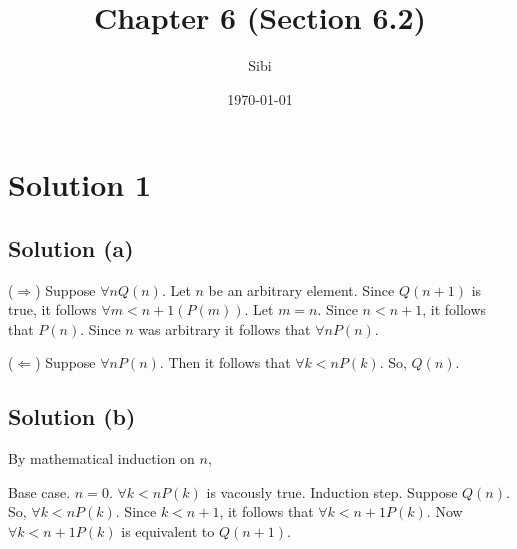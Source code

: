 \documentclass{article}
\begin{document}
\title{Chapter 6 (Section 6.2)}
\author{Sibi}
\date{\today}
\maketitle

\DeclarePairedDelimiter\abs{\lvert}{\rvert}%
\DeclarePairedDelimiter\norm{\lVert}{\rVert}%

\makeatletter
\let\oldabs\abs
\def\abs{\@ifstar{\oldabs}{\oldabs*}}
%
\let\oldnorm\norm
\def\norm{\@ifstar{\oldnorm}{\oldnorm*}}
\makeatother
\newpage

\section{Solution 1}

\subsection{Solution (a)}

($\Rightarrow$) Suppose $\forall n Q(n)$. Let $n$ be an arbitrary element. Since $Q(n+1)$ is true, it follows $\forall m < n + 1(P(m))$. Let $m = n$. Since $n < n + 1$, it follows that $P(n)$. Since $n$ was arbitrary it follows that $\forall n P(n)$.

($\Leftarrow$) Suppose $\forall n P(n)$. Then it follows that $\forall k < n P(k)$. So, $Q(n)$.

\subsection{Solution (b)}

By mathematical induction on $n$,

Base case. $n = 0$. $\forall k < n P(k)$ is vacously true.
Induction step. Suppose $Q(n)$. So, $\forall k < n P(k)$. Since $k < n + 1$, it follows that $\forall k < n + 1 P(k)$. Now $\forall k < n + 1 P(k)$ is equivalent to $Q(n + 1)$.
\end{document}
